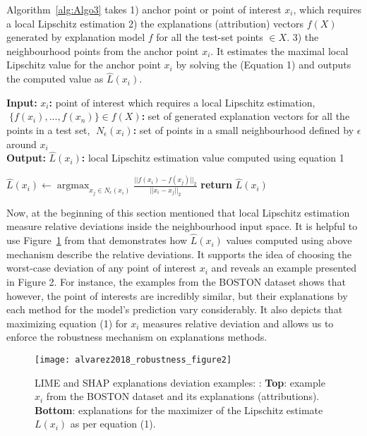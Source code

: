 \documentclass[english]{tktltiki2}
\theoremstyle{definition}
\theoremstyle{remark}
\newcommand{\onespace}{\;}
\begin{document}
Algorithm~\ref{alg:Algo3} takes 1) anchor point or point of interest $x_i$, which requires a local Lipschitz estimation 2) the explanations (attribution) vectors $f(X)$ generated by explanation model $f$  for all the test-set points $\in X$. 3) the neighbourhood points from the anchor point $x_i$. It estimates the maximal local Lipschitz value for the anchor point $x_i$ by solving the (Equation 1) and outputs the computed value as $\hat{L}(x_i)$.
\begin{algorithm}[H]
	\caption{$LocalLipschitzEstimate(x_i,\onespace f(X),\onespace N_\epsilon(x_i))$}
	\label{alg:Algo3}
	\hspace*{\algorithmicindent} \textbf{Input}\textbf{:} $x_i$\textbf{:} point of interest which requires a local Lipschitz estimation, $\onespace \{f(x_i),...,f(x_n)\} \in f(X)$\textbf{:} set of generated explanation vectors for all the points in a test set, $\onespace N_\epsilon(x_i)$\textbf{:} set of points in a small neighbourhood defined by $\epsilon$ around $x_i$ \\
	\hspace*{\algorithmicindent} \textbf{Output}\textbf{:} $\hat{L}(x_i)$\textbf{:} local Lipschitz estimation value computed using equation 1
	\begin{algorithmic}[1]
		\State $\hat{L}(x_i) \gets \operatorname*{argmax}_{x_j \in N_\epsilon(x_i)} \frac{||f(x_i) - f(x_j)||_2}{||x_i - x_j||_2}$ 
		\State \textbf{return} $\hat{L}(x_i)$

	\end{algorithmic}
\end{algorithm}

Now, at the beginning of this section mentioned that local Lipschitz estimation measure relative deviations inside the neighbourhood input space. It is helpful to use Figure~\ref{fig:alvarez2018_robustness_figure2} from \citep{alvarez2018robustness} that demonstrates how $\hat{L}(x_i)$ values computed using above mechanism describe the relative deviations. It supports the idea of choosing the worst-case deviation of any point of interest $x_i$ and reveals an example presented in Figure 2. For instance, the examples from the BOSTON dataset shows that however, the point of interests are incredibly similar, but their explanations by each method for the model’s prediction vary considerably. It also depicts that maximizing equation (1) for $x_i$ measures relative deviation and allows us to enforce the robustness mechanism on explanations methods.
\begin{figure}[H]
	\texttt{[image: alvarez2018\_robustness\_figure2]}
	\vspace*{-10mm}
	\caption{LIME and SHAP explanations deviation examples: \citep{alvarez2018robustness}: \textbf{Top}: example $x_i$ from the BOSTON dataset and its explanations (attributions). \textbf{Bottom}: explanations for the maximizer of the Lipschitz estimate $L(x_i)$ as per equation (1).}
	\label{fig:alvarez2018_robustness_figure2}
\end{figure}
\end{document}
